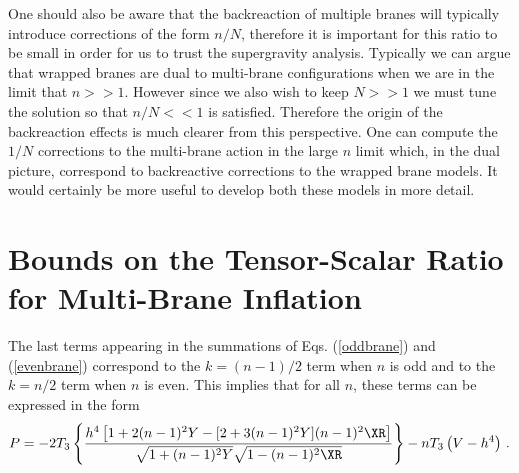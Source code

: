 One should also be aware that the backreaction of multiple branes will
typically introduce corrections of the form $n/N$, therefore it is important
for this ratio to be small in order for us to trust the supergravity analysis.
Typically we can argue that wrapped branes are dual to multi-brane configurations when
we are in the limit that $n>>1$. However since we also wish to keep $N>>1$ we must tune
the solution so that $n/N<<1$ is satisfied. Therefore the origin of the backreaction effects
is much clearer from this perspective. One can compute the $1/N$ corrections to the multi-brane
action in the large $n$ limit \cite{Ward:2007gs} which, in the dual picture, correspond to
backreactive corrections
to the wrapped brane models. It would certainly be more useful to develop both these models in more
detail.

\section{Bounds on the Tensor-Scalar Ratio for Multi-Brane 
Inflation} \label{sec:multibounds}

The last terms appearing in the summations of Eqs. (\ref{oddbrane}) 
and (\ref{evenbrane}) correspond  to the $k=(n-1)/2$ 
term when $n$ is odd and to the $k=n/2$ term when $n$ is even. This 
implies that for all $n$, these terms can be expressed in the form 
\begin{equation}
\label{unifiedgenP}
P = -2T_3 \left\{ \frac{h^4 \left[ 1+2(n-1)^2Y
- [ 2+3(n-1)^2Y] (n-1)^2\XR  \right]}{\sqrt{1+(n-1)^2Y}
\sqrt{1-(n-1)^2\XR}} 
 \right\} -n T_3 \left( V -h^4 \right) \,.
\end{equation}

